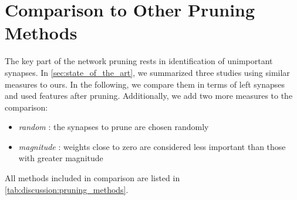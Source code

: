 \section{Comparison to Other Pruning Methods} \label{sec:comparison_of_pruning_methods}
The key part of the network pruning rests in identification of unimportant synapses. In \cref{sec:state_of_the_art}, we summarized three studies using similar measures to ours. In the following, we compare them in terms of left synapses and used features after pruning. Additionally, we add two more measures to the comparison:

\begin{itemize}
\item \textit{random} : the synapses to prune are chosen randomly
\item \textit{magnitude} : weights close to zero are considered less important than those with greater magnitude
\end{itemize}

All methods included in comparison are listed in \cref{tab:discussion:pruning_methods}.

\begin{table}[H]
\centering
{}
\caption{Known measures of how important synapse corresponding to $ w_k $ is.}
\label{tab:discussion:pruning_methods}
\end{table}

